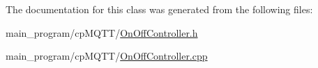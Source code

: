 The documentation for this class was generated from the following files\+:\begin{DoxyCompactItemize}
\item 
main\+\_\+program/cp\+M\+Q\+T\+T/\hyperlink{_on_off_controller_8h}{On\+Off\+Controller.\+h}\item 
main\+\_\+program/cp\+M\+Q\+T\+T/\hyperlink{_on_off_controller_8cpp}{On\+Off\+Controller.\+cpp}\end{DoxyCompactItemize}
